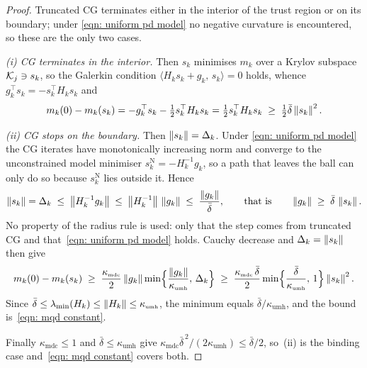 \documentclass[11pt]{article}
\theoremstyle{plain}
\theoremstyle{definition}
\theoremstyle{remark}
\numberwithin{equation}{section}
\newcommand*\mykappa[1]{\kappa_{\scriptscriptstyle\text{#1}}}
\begin{document}
\begin{proof}
    Truncated CG terminates either in the interior of the trust region or on its boundary; under
    \eqref{eqn: uniform pd model} no negative curvature is encountered, so these are the only two
    cases.

    \emph{(i) CG terminates in the interior.} Then $s_k$ minimises $m_k$ over a Krylov subspace
    ${\mathcal{K}}_j \ni s_k$, so the Galerkin condition $\langle H_k s_k + g_k,\, s_k\rangle = 0$ holds,
    whence $g_k^\top s_k = -s_k^\top H_k s_k$ and
    \begin{equation}
        m_k(0) - m_k(s_k) = -g_k^\top s_k - \tfrac12 s_k^\top H_k s_k
          = \tfrac12 s_k^\top H_k s_k \;\geq\; \tfrac12\bar\delta\left \lVert s_k \right \rVert^2 .
        \label{eqn: galerkin}
    \end{equation}

    \emph{(ii) CG stops on the boundary.} Then $\left \lVert s_k \right \rVert = \Delta_k$. Under
    \eqref{eqn: uniform pd model} the CG iterates have monotonically increasing norm and converge
    to the unconstrained model minimiser $s^{\mathrm{N}}_k = -H_k^{-1}g_k$, so a path that leaves
    the ball can only do so because $s^{\mathrm{N}}_k$ lies outside it. Hence
    \begin{equation}
        \left \lVert s_k \right \rVert = \Delta_k \;\leq\; \left \lVert H_k^{-1}g_k \right \rVert
          \;\leq\; \left \lVert H_k^{-1} \right \rVert\,\left \lVert g_k \right \rVert \;\leq\; \frac{\left \lVert g_k \right \rVert}{\bar\delta} ,
        \qquad\text{that is}\qquad
        \left \lVert g_k \right \rVert \;\geq\; \bar\delta\,\left \lVert s_k \right \rVert .
        \label{eqn: boundary gradient bound}
    \end{equation}
    No property of the radius rule is used: only that the step comes from truncated CG and
    that~\eqref{eqn: uniform pd model} holds. Cauchy decrease and $\Delta_k = \left \lVert s_k \right \rVert$ then
    give
    \begin{equation*}
        m_k(0) - m_k(s_k)
          \;\geq\; \frac{\mykappa{mdc}}{2}\norm{g_k}
            \min\Bigl\{\frac{\norm{g_k}}{\mykappa{umh}},\, \Delta_k\Bigr\}
          \;\geq\; \frac{\mykappa{mdc}\,\bar\delta}{2}
            \min\Bigl\{\frac{\bar\delta}{\mykappa{umh}},\, 1\Bigr\}\norm{s_k}^2 .
    \end{equation*}
    Since $\bar\delta \leq \lambda_{\min}(H_k) \leq \norm{H_k} \leq \mykappa{umh}$, the minimum
    equals $\bar\delta/\mykappa{umh}$, and the bound is~\eqref{eqn: mqd constant}.

    Finally $\mykappa{mdc} \leq 1$ and $\bar\delta \leq \mykappa{umh}$ give
    $\mykappa{mdc}\bar\delta^{\,2}/(2\mykappa{umh}) \leq \bar\delta/2$, so~(ii) is the binding case
    and~\eqref{eqn: mqd constant} covers both.
\end{proof}
\end{document}
